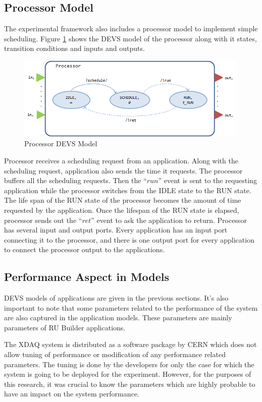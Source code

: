 \subsection{Processor Model}
The experimental framework also includes a processor model to implement simple scheduling. Figure \ref{fig:Processor} shows the DEVS model of the processor along with it states, transition conditions and inputs and outputs.


\begin{figure}
	\centering
		\includegraphics[width=0.99\textwidth]{figures/Processor.png}
	\caption{Processor DEVS Model}
	\label{fig:Processor}
\end{figure}

Processor receives a scheduling request from an application. Along with the scheduling request, application also sends the time it requests. The processor buffers all the scheduling requests. Then the ``$run$'' event is sent to the requesting application while the processor switches from the IDLE state to the RUN state. The life span of the RUN state of the processor becomes the amount of time requested by the application. Once the lifespan of the RUN state is elapsed, processor sends out the ``$ret$'' event to ask the application to return. Processor has several input and output ports. Every application has an input port connecting it to the processor, and there is one output port for every application to connect the processor output to the applications.

\subsection{Performance Aspect in Models}
DEVS models of applications are given in the previous sections. It's also important to note that some parameters related to the performance of the system are also captured in the application models. These parameters are mainly parameters of RU Builder applications. 

The XDAQ system is distributed as a software package by CERN which does not allow tuning of performance or modification of any performance related parameters. The tuning is done by the developers for only the case for which the system is going to be deployed for the experiment. However, for the purposes of this research, it was crucial to know the parameters which are highly probable to have an impact on the system performance. 

